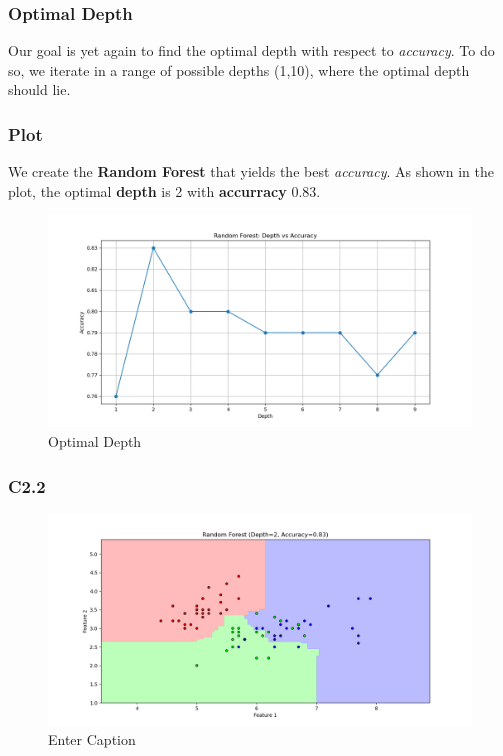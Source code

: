 \documentclass{beamer}
\begin{document}
\begin{frame}
\frametitle{Optimal Depth}
Our goal is yet again to find the optimal depth with respect to \textit{accuracy}. To do so, we iterate in a range of possible depths (1,10), where the optimal depth should lie.
\end{frame}

\begin{frame}
\frametitle{Plot}
We create the \textbf{Random Forest} that yields the best \textit{accuracy}. As shown in the plot, the optimal \textbf{depth} is 2 with \textbf{accurracy} 0.83.
\begin{figure}
    \centering
    \includegraphics[width=1\linewidth]{assets/C2.1.png}
    \caption{Optimal Depth}
    \label{fig:enter-label}
\end{figure}
\end{frame}

\begin{frame}
\frametitle{C2.2}
\begin{figure}
    \centering
    \includegraphics[width=1\linewidth]{assets/C2.2.png}
    \caption{Enter Caption}
    \label{fig:enter-label}
\end{figure}
\end{frame}
\end{document}
